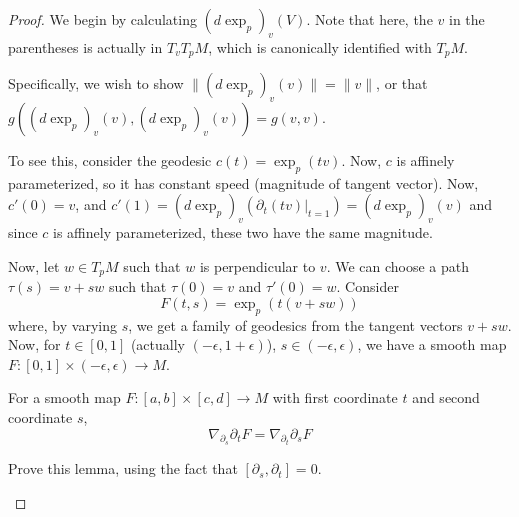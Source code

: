 \documentclass[../main.tex]{subfiles}
\begin{document}
\begin{proof}
    We begin by calculating $(d\exp_p)_v(V)$. Note that here, the $v$ in the
    parentheses is actually in $T_vT_pM$, which is canonically identified with
    $T_pM$.

    Specifically, we wish to show $\|(d\exp_p)_v(v)\| = \|v\|$, or that
    $g((d\exp_p)_v(v),(d\exp_p)_v(v)) = g(v,v)$.

    To see this, consider the geodesic $c(t) = \exp_p(tv)$. Now, $c$ is affinely
    parameterized, so it has constant speed (magnitude of tangent vector). Now,
    $c'(0)=v$, and $c'(1) = (d\exp_p)_v(\partial_t(tv)|_{t=1}) =
    (d\exp_p)_v(v)$ and since $c$ is affinely parameterized, these two have the
    same magnitude.

    Now, let $w\in T_pM$ such that $w$ is perpendicular to $v$. We can choose a
    path $\tau(s) = v+sw$ such that $\tau(0) = v$ and $\tau'(0) = w$.
    Consider
    \[
        F(t,s) = \exp_p(t(v+sw))
    \]
    where, by varying $s$, we get a family of geodesics from the tangent vectors
    $v+sw$. Now, for $t\in [0,1]$ (actually $(-\epsilon, 1+\epsilon)$), $s\in
    (-\epsilon,\epsilon)$, we have a smooth map $F:[0,1]\times
    (-\epsilon,\epsilon) \to M$.

    \begin{lemma}
        For a smooth map $F:[a,b]\times [c,d]\to M$ with first coordinate $t$
        and second coordinate $s$,
        \[
            \nabla_{\partial_s}\partial_t F = \nabla_{\partial_t}\partial_s F
        \]
    \end{lemma}
    \begin{hw}
        Prove this lemma, using the fact that $[\partial_s,\partial_t]=0$.
    \end{hw}


\end{proof}
\end{document}
